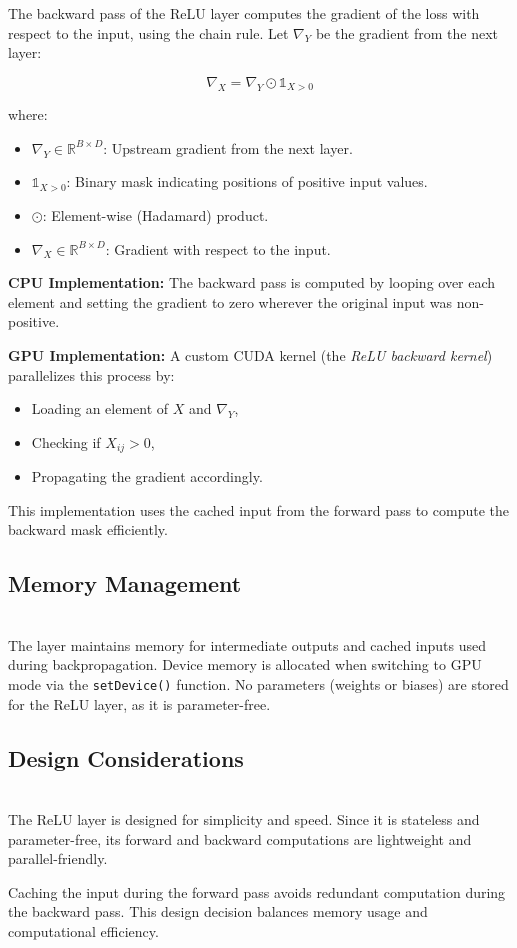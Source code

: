 The backward pass of the ReLU layer computes the gradient of the loss with respect to the input, using the chain rule. Let \( \nabla_Y \) be the gradient from the next layer:

\[
    \nabla_X = \nabla_Y \odot \mathbb{1}_{X > 0}
\]

where:
\begin{itemize}
    \item \( \nabla_Y \in \mathbb{R}^{B \times D} \): Upstream gradient from the next layer.
    \item \( \mathbb{1}_{X > 0} \): Binary mask indicating positions of positive input values.
    \item \( \odot \): Element-wise (Hadamard) product.
    \item \( \nabla_X \in \mathbb{R}^{B \times D} \): Gradient with respect to the input.
\end{itemize}

\textbf{CPU Implementation:}  
The backward pass is computed by looping over each element and setting the gradient to zero wherever the original input was non-positive.

\textbf{GPU Implementation:}  
A custom CUDA kernel (the \textit{ReLU backward kernel}) parallelizes this process by:

\begin{itemize}
    \item Loading an element of \( X \) and \( \nabla_Y \),
    \item Checking if \( X_{ij} > 0 \),
    \item Propagating the gradient accordingly.
\end{itemize}

This implementation uses the cached input from the forward pass to compute the backward mask efficiently.

\subsection{Memory Management}\\
The layer maintains memory for intermediate outputs and cached inputs used during backpropagation. Device memory is allocated when switching to GPU mode via the \texttt{setDevice()} function. No parameters (weights or biases) are stored for the ReLU layer, as it is parameter-free.

\subsection{Design Considerations}\\
The ReLU layer is designed for simplicity and speed. Since it is stateless and parameter-free, its forward and backward computations are lightweight and parallel-friendly. 

Caching the input during the forward pass avoids redundant computation during the backward pass. This design decision balances memory usage and computational efficiency.
